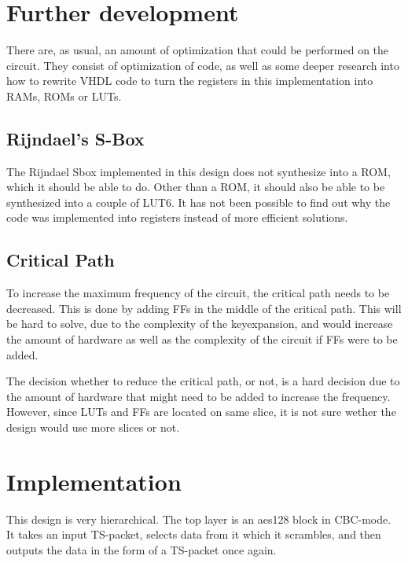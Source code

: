 
\section{Further development}
There are, as usual, an amount of optimization that could be performed 
on the circuit. They consist of optimization of code, as well as some 
deeper research into how to rewrite VHDL code to turn the registers in 
this implementation into RAMs, ROMs or LUTs.

\subsection{Rijndael's S-Box}
The Rijndael Sbox implemented in this design does not synthesize into a 
ROM, which it should be able to do. Other than a ROM, it should also be 
able to be synthesized into a couple of LUT6.
It has not been possible to find out why the code was implemented into 
registers instead of more efficient solutions.

\subsection{Critical Path}\label{sec:c_path}
To increase the maximum frequency of the circuit, the critical path 
needs to be decreased. This is done by adding FFs in the middle of the 
critical path. This will be hard to solve, due to the complexity of the 
keyexpansion, and would increase the amount of hardware as well as the 
complexity of the circuit if FFs were to be added.

The decision whether to reduce the critical path, or not, is a hard 
decision due to the amount of hardware that might need to be added to
increase the frequency. However, since LUTs and FFs are located on 
same slice, it is not sure wether the design would use more slices or 
not.


\section{Implementation}
This design is very hierarchical. The top layer is an aes128 block in 
CBC-mode. It takes an input TS-packet, selects data from it which it 
scrambles, and then outputs the data in the form of a TS-packet once 
again.

